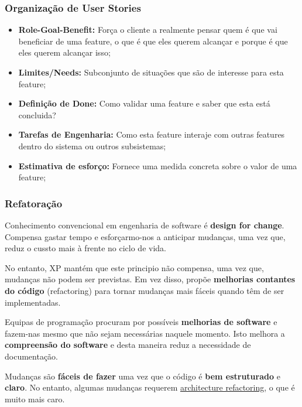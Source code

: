 \documentclass{article}
\begin{document}
\subsubsection{Organização de User Stories}

\begin{itemize}
  \item \textbf{Role-Goal-Benefit:} Força o cliente a realmente pensar
  quem é que vai beneficiar de uma feature, o que é que eles querem
  alcançar e porque é que eles querem alcançar isso;

  \item \textbf{Limites/Needs:} Subconjunto de situações que são de interesse para esta feature;
  \item \textbf{Definição de Done:} Como validar uma feature e saber que esta está concluida?
  \item \textbf{Tarefas de Engenharia:} Como esta feature interaje com outras features
  dentro do sistema ou outros subsistemas;
  \item \textbf{Estimativa de esforço:} Fornece uma medida concreta sobre o valor de uma feature;
\end{itemize}

\subsubsection{Refatoração}

Conhecimento convencional em engenharia de software é \textbf{design for change}.
Compensa gastar tempo e esforçarmo-nos a anticipar mudanças, uma vez que,
reduz o cussto mais à frente no ciclo de vida.

\vspace{2mm}

No entanto, XP mantém que este principio não compensa, uma vez que,
mudanças não podem ser previstas. Em vez disso, propõe
\textbf{melhorias contantes do código} (refactoring) para tornar
mudanças mais fáceis quando têm de ser implementadas.

\vspace{2mm}

Equipas de programação procuram por possíveis \textbf{melhorias de software}
e fazem-nas mesmo que não sejam necessárias naquele momento.
Isto melhora a \textbf{compreensão do software} e desta maneira reduz
a necessidade de documentação.

\vspace{2mm}

Mudanças são \textbf{fáceis de fazer} uma vez que o código é
\textbf{bem estruturado} e \textbf{claro}. No entanto, algumas mudanças
requerem \uline{architecture refactoring}, o que é muito mais caro.
\end{document}
